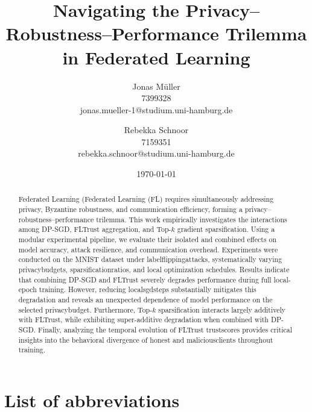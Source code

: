 \documentclass[11pt,twocolumn,a4paper,DIV=calc,parskip=half]{scrartcl}
\begin{document}
	
	\title{Navigating the Privacy--Robustness--Performance Trilemma in Federated Learning}
	\author{Jonas Müller\\\normalsize{7399328}\\\normalsize{jonas.mueller-1@studium.uni-hamburg.de} \and Rebekka Schnoor\\\normalsize{7159351}\\\normalsize{rebekka.schnoor@studium.uni-hamburg.de}}
	\date{\today}
	\maketitle
	
	\begin{abstract}
	Federated Learning (Federated Learning (FL) requires simultaneously addressing privacy, Byzantine robustness, and communication efficiency, forming a privacy--robustness--performance trilemma. This work empirically investigates the interactions among \ac{DP-SGD}, FLTrust aggregation, and Top-$k$ gradient sparsification. Using a modular experimental pipeline, we evaluate their isolated and combined effects on model accuracy, attack resilience, and communication overhead. Experiments were conducted on the MNIST dataset under \glspl{labelflippingattack}, systematically varying \glspl{privacybudget}, \glspl{sparsificationratio}, and local optimization schedules. Results indicate that combining \ac{DP-SGD} and FLTrust severely degrades performance during full local-epoch training. However, reducing \glspl{localsgdstep} substantially mitigates this degradation and reveals an unexpected dependence of model performance on the selected \gls{privacybudget}. Furthermore, Top-$k$ sparsification interacts largely additively with FLTrust, while exhibiting super-additive degradation when combined with \ac{DP-SGD}. Finally, analyzing the temporal evolution of FLTrust \glspl{trustscore} provides critical insights into the behavioral divergence of honest and \glspl{maliciousclient} throughout training.
	\end{abstract}
	
	\tableofcontents
	
	\section*{List of abbreviations}
	\begin{acronym}
	\end{acronym}
	
\end{document}
